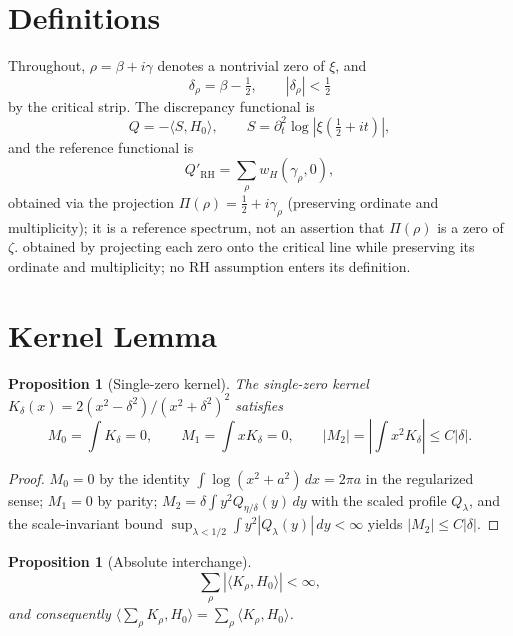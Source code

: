 \documentclass[11pt]{article}
\newtheorem{proposition}[theorem]{Proposition}
\begin{document}
\section{Definitions}

Throughout, $\rho=\beta+i\gamma$ denotes a nontrivial zero of $\xi$, and
\begin{equation}
\delta_\rho=\beta-\tfrac12,\qquad
|\delta_\rho|<\tfrac12
\end{equation}
by the critical strip.  The discrepancy functional is
\begin{equation}
Q=-\langle S,H_0\rangle,\qquad
S=\partial_t^2\log|\xi(\tfrac12+it)|,
\end{equation}
and the reference functional is
\begin{equation}
Q'_{\mathrm{RH}}=\sum_\rho w_H(\gamma_\rho,0),
\end{equation}
obtained via the projection $\Pi(\rho)=\tfrac12+i\gamma_\rho$
(preserving ordinate and multiplicity); it is a reference spectrum, not
an assertion that $\Pi(\rho)$ is a zero of $\zeta$.
obtained by projecting each zero onto the critical line while preserving
its ordinate and multiplicity; no RH assumption enters its definition.

\section{Kernel Lemma}

\begin{proposition}[Single-zero kernel]\label{prop:a1}
The single-zero kernel
$K_\delta(x)=2(x^2-\delta^2)/(x^2+\delta^2)^2$ satisfies
\begin{equation}
M_0=\int K_\delta=0,\qquad
M_1=\int xK_\delta=0,\qquad
|M_2|=\left|\int x^2K_\delta\right|\le C|\delta|.
\end{equation}
\end{proposition}

\begin{proof}
$M_0=0$ by the identity $\int\log(x^2+a^2)\,dx=2\pi a$ in the
regularized sense; $M_1=0$ by parity; $M_2=\delta\int y^2Q_{\eta/\delta}(y)
\,dy$ with the scaled profile $Q_\lambda$, and the scale-invariant bound
$\sup_{\lambda<1/2}\int y^2|Q_\lambda(y)|\,dy<\infty$ yields
$|M_2|\le C|\delta|$.
\end{proof}

\begin{proposition}[Absolute interchange]\label{prop:a2}
\begin{equation}
\sum_\rho |\langle K_\rho,H_0\rangle|<\infty,
\end{equation}
and consequently
$\langle\sum_\rho K_\rho,H_0\rangle=\sum_\rho\langle K_\rho,H_0\rangle$.
\end{proposition}
\end{document}
